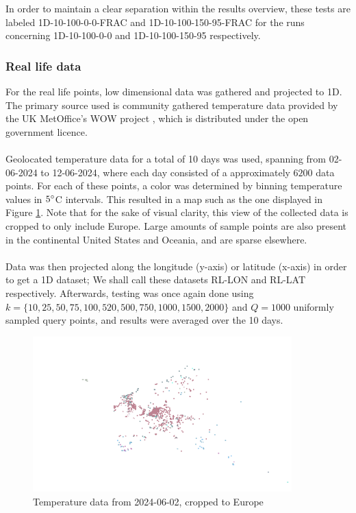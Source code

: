 \documentclass{article}
\begin{document}
In order to maintain a clear separation within the results overview, these tests are labeled 1D-10-100-0-0-FRAC and 1D-10-100-150-95-FRAC for the runs concerning 1D-10-100-0-0 and 1D-10-100-150-95 respectively.

\subsubsection*{Real life data}
For the real life points, low dimensional data was gathered and projected to 1D. The primary source used is community gathered temperature data provided by the UK MetOffice's WOW project \cite{Met}, which is distributed under the open government licence. \\\\
Geolocated temperature data for a total of 10 days was used, spanning from 02-06-2024 to 12-06-2024, where each day consisted of a approximately $6200$ data points. For each of these points, a color was determined by binning temperature values in $5\degree$C intervals. This resulted in a map such as the one displayed in Figure \ref{fig:temp-data}. Note that for the sake of visual clarity, this view of the collected data is cropped to only include Europe. Large amounts of sample points are also present in the continental United States and Oceania, and are sparse elsewhere. \\\\
Data was then projected along the longitude (y-axis) or latitude (x-axis) in order to get a 1D dataset; We shall call these datasets RL-LON and RL-LAT respectively. Afterwards, testing was once again done using $k=\{10, 25, 50, 75, 100, 520, 500, 750, 1000, 1500, 2000\}$ and $Q=1000$ uniformly sampled query points, and results were averaged over the 10 days. 
\begin{figure}
    \centering
    \includegraphics[width=10cm]{figs/temperature-02-06-2024-cropped.png}
    \caption{Temperature data from 2024-06-02, cropped to Europe}
    \label{fig:temp-data}
\end{figure}
\end{document}
